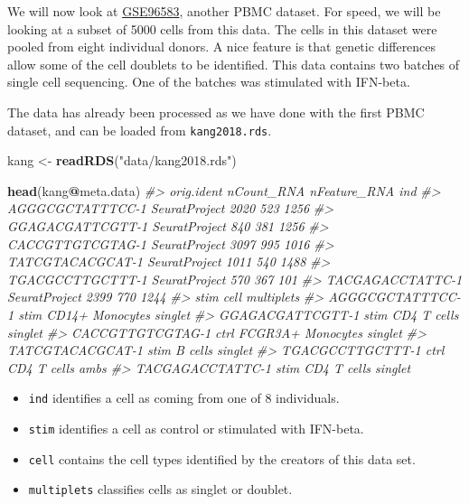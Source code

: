 \documentclass[
]{book}
\newenvironment{Shaded}{\begin{snugshade}}{\end{snugshade}}
\newcommand{\CommentTok}[1]{\textcolor[rgb]{0.56,0.35,0.01}{\textit{#1}}}
\newcommand{\FunctionTok}[1]{\textcolor[rgb]{0.13,0.29,0.53}{\textbf{#1}}}
\newcommand{\NormalTok}[1]{#1}
\newcommand{\OtherTok}[1]{\textcolor[rgb]{0.56,0.35,0.01}{#1}}
\newcommand{\SpecialCharTok}[1]{\textcolor[rgb]{0.81,0.36,0.00}{\textbf{#1}}}
\newcommand{\StringTok}[1]{\textcolor[rgb]{0.31,0.60,0.02}{#1}}
\providecommand{\tightlist}{%
  \setlength{\itemsep}{0pt}\setlength{\parskip}{0pt}}
\begin{document}
We will now look at \href{https://www.ncbi.nlm.nih.gov/geo/query/acc.cgi?acc=GSE96583}{GSE96583}, another PBMC dataset. For speed, we will be looking at a subset of 5000 cells from this data. The cells in this dataset were pooled from eight individual donors. A nice feature is that genetic differences allow some of the cell doublets to be identified. This data contains two batches of single cell sequencing. One of the batches was stimulated with IFN-beta.

The data has already been processed as we have done with the first PBMC dataset, and can be loaded from \texttt{kang2018.rds}.

\begin{Shaded}
\begin{Highlighting}[]
\NormalTok{kang }\OtherTok{\textless{}{-}} \FunctionTok{readRDS}\NormalTok{(}\StringTok{"data/kang2018.rds"}\NormalTok{)}

\FunctionTok{head}\NormalTok{(kang}\SpecialCharTok{@}\NormalTok{meta.data)}
\CommentTok{\#\textgreater{}                     orig.ident nCount\_RNA nFeature\_RNA  ind}
\CommentTok{\#\textgreater{} AGGGCGCTATTTCC{-}1 SeuratProject       2020          523 1256}
\CommentTok{\#\textgreater{} GGAGACGATTCGTT{-}1 SeuratProject        840          381 1256}
\CommentTok{\#\textgreater{} CACCGTTGTCGTAG{-}1 SeuratProject       3097          995 1016}
\CommentTok{\#\textgreater{} TATCGTACACGCAT{-}1 SeuratProject       1011          540 1488}
\CommentTok{\#\textgreater{} TGACGCCTTGCTTT{-}1 SeuratProject        570          367  101}
\CommentTok{\#\textgreater{} TACGAGACCTATTC{-}1 SeuratProject       2399          770 1244}
\CommentTok{\#\textgreater{}                  stim              cell multiplets}
\CommentTok{\#\textgreater{} AGGGCGCTATTTCC{-}1 stim   CD14+ Monocytes    singlet}
\CommentTok{\#\textgreater{} GGAGACGATTCGTT{-}1 stim       CD4 T cells    singlet}
\CommentTok{\#\textgreater{} CACCGTTGTCGTAG{-}1 ctrl FCGR3A+ Monocytes    singlet}
\CommentTok{\#\textgreater{} TATCGTACACGCAT{-}1 stim           B cells    singlet}
\CommentTok{\#\textgreater{} TGACGCCTTGCTTT{-}1 ctrl       CD4 T cells       ambs}
\CommentTok{\#\textgreater{} TACGAGACCTATTC{-}1 stim       CD4 T cells    singlet}
\end{Highlighting}
\end{Shaded}

\begin{itemize}
\tightlist
\item
  \texttt{ind} identifies a cell as coming from one of 8 individuals.
\item
  \texttt{stim} identifies a cell as control or stimulated with IFN-beta.
\item
  \texttt{cell} contains the cell types identified by the creators of this data set.
\item
  \texttt{multiplets} classifies cells as singlet or doublet.
\end{itemize}
\end{document}
